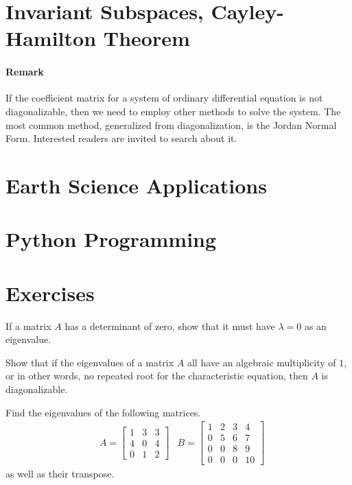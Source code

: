 \section{Invariant Subspaces, Cayley-Hamilton Theorem}

\paragraph{Remark} If the coefficient matrix for a system of ordinary differential equation is not diagonalizable, then we need to employ other methods to solve the system. The most common method, generalized from diagonalization, is the Jordan Normal Form. Interested readers are invited to search about it.

\section{Earth Science Applications}

\section{Python Programming}

\section{Exercises}

\begin{Exercise}
If a matrix $A$ has a determinant of zero, show that it must have $\lambda = 0$ as an eigenvalue.
\end{Exercise}

\begin{Exercise}
Show that if the eigenvalues of a matrix $A$ all have an algebraic multiplicity of $1$, or in other words, no repeated root for the characteristic equation, then $A$ is diagonalizable. 
\end{Exercise}

\begin{Exercise}
Find the eigenvalues of the following matrices.
\begin{align*}
&A =
\begin{bmatrix}
1 & 3 & 3\\
4 & 0 & 4\\
0 & 1 & 2
\end{bmatrix}
&B =
\begin{bmatrix}
1 & 2 & 3 & 4\\
0 & 5 & 6 & 7\\
0 & 0 & 8 & 9\\
0 & 0 & 0 & 10
\end{bmatrix}
\end{align*}
as well as their transpose.
\end{Exercise}

